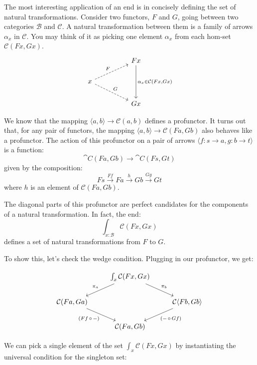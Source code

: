 \documentclass[DaoFP]{subfiles}
\begin{document}
The most interesting application of an end is in concisely defining the set of natural transformations. Consider two functors, $F$ and $G$, going between two categories  $\mathcal{B}$ and $\mathcal{C}$. A natural transformation between them is a family of arrows $\alpha_x$ in $\mathcal{C}$. You may think of it as picking one element $\alpha_x$ from each hom-set  $\mathcal{C} (F x, G x)$.
\[
 \begin{tikzcd}
 && F x
 \arrow[dd, "{\alpha_x \in \cat C (F x, G x)}"]
 \\
 x
 \arrow[urr, dashed, "F"]
 \arrow[drr, dashed, "G"]
 \\
 && G x
 \end{tikzcd}
\]

We know that the mapping $\langle a, b \rangle \to \mathcal{C} (a, b)$ defines a profunctor.  It turns out that, for any pair of functors, the mapping  $\langle a, b \rangle \to \mathcal{C} (F a, G b)$ also behaves like a profunctor. The action of this profunctor on a pair of arrows $\langle f \colon s \to a, g \colon b \to t \rangle$ is a function:
\[ \cat C(F a, G b) \to \cat C (F s, G t) \]
given by the composition:
\[ F s \xrightarrow{F f} F a \xrightarrow{h} G b \xrightarrow{G g} G t \]
where $h$ is an  element of $ \mathcal{C} (F a, G b)$.

The diagonal parts of this profunctor are perfect candidates for the components of a natural transformation. In fact, the end:
\[  \int_{x \colon  \mathcal{B}} \mathcal{C}(F x, G x) \]
defines a set of natural transformations from $F$ to $G$.

To show this, let's check the wedge condition. Plugging in our profunctor, we get:

\[
 \begin{tikzcd}
 & \int_{x} \mathcal{C}(F x, G x)
 \arrow[ld, "\pi_a"']
 \arrow[rd, "\pi_b"]
 \\
  \mathcal{C} ( F a, G a )
 \arrow[dr, "{(Ff \, \circ \, -)}"']
 && \mathcal{C} \langle F b, G b \rangle
 \arrow[dl, "{(- \, \circ\, Gf)}"]
 \\
 &  \mathcal{C} ( F a, G b )
 \end{tikzcd}
\]

We can pick a single element of the set $\int_{x} \mathcal{C}(F x, G x)$ by instantiating the universal condition for the singleton set:
\end{document}
